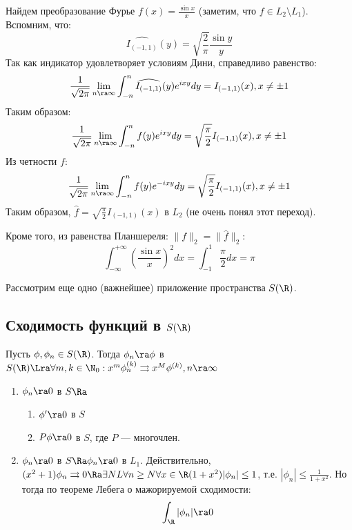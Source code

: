 \begin{example}
    Найдем преобразование Фурье \(f(x) = \frac{\sin x}{x}\) (заметим, что \(f \in L_2 \setminus L_1\)). Вспомним, что:
    \[\widehat{I_{(-1, 1)}}(y) = \sqrt{\frac{2}{\pi}}\frac{\sin y}{y}\]
    Так как индикатор удовлетворяет условиям Дини, справедливо равенство:
    \[\frac{1}{\sqrt{2\pi}}\lim_{n \ra \infty} \int_{-n}^n \widehat{I_{(-1, 1)}}(y)e^{ixy}dy = I_{(-1, 1)}(x), x \ne \pm 1\]
    Таким образом:
    \[\frac{1}{\sqrt{2\pi}}\lim_{n \ra \infty} \int_{-n}^n f(y)e^{ixy}dy = \sqrt{\frac{\pi}{2}}I_{(-1, 1)}(x), x \ne \pm 1\]
    Из четности \(f\):
    \[\frac{1}{\sqrt{2\pi}}\lim_{n \ra \infty} \int_{-n}^n f(y)e^{-ixy}dy = \sqrt{\frac{\pi}{2}}I_{(-1, 1)}(x), x \ne \pm 1\]
    Таким образом, \(\widehat{f} = \sqrt{\frac{\pi}{2}}I_{(-1, 1)}(x)\) в \(L_2\) (не очень понял этот переход).

    Кроме того, из равенства Планшереля: \(\|f\|_2 = \|\widehat{f}\|_2\):
    \[\int_{-\infty}^{+\infty}\left( \frac{\sin x}{x} \right)^2dx = \int_{-1}^{1}\frac{\pi}{2}dx = \pi\]
\end{example}

Рассмотрим еще одно (важнейшее) приложение пространства \(S(\R)\).

\subsection{Сходимость функций в \(S(\R)\)}

\begin{definition}
    Пусть \(\phi, \phi_n \in S(\R)\). Тогда \(\phi_n \ra \phi\) в \(S(\R) \Lra \forall m, k \in \N_0: x^m\phi_n^{(k)} \rightrightarrows x^M\phi^{(k)}, n \ra \infty\)
\end{definition}

\begin{note}
    \begin{enumerate}
        \item \(\phi_n \ra 0\) в \(S \Ra\) 
        \begin{enumerate}
            \item \(\phi' \ra 0\) в \(S\)
            \item \(P\phi \ra 0\) в \(S\), где \(P\) --- многочлен.
        \end{enumerate}
        \item \(\phi_n \ra 0\) в \(S \Ra \phi_n \ra 0\) в \(L_1\). Действительно, \((x^2 + 1)\phi_n \rightrightarrows 0 \Ra \exists NL \forall n \ge N \forall x \in \R (1 + x^2) |\phi_n| \le 1\), т.е. \(|\phi_n| \le \frac{1}{1 + x^2}\). Но тогда по теореме Лебега о мажорируемой сходимости:
        \[\int_\R |\phi_n| \ra 0\]
    \end{enumerate}
\end{note}

